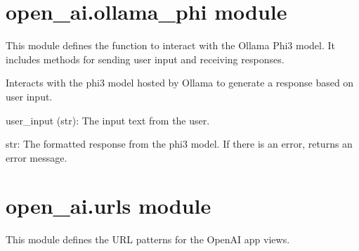\documentclass[letterpaper,10pt,english]{sphinxmanual}
\begin{document}
\section{open\_ai.ollama\_phi module}
\label{\detokenize{open_ai:open-ai-ollama-phi-module}}
\sphinxAtStartPar
This module defines the function to interact with the Ollama Phi3 model. It includes methods for sending user input and receiving responses.
\label{\detokenize{open_ai:module-open_ai.ollama_phi}}

\begin{fulllineitems}
\label{\detokenize{open_ai:open_ai.ollama_phi.get_phi3_response}}
\pysigstartsignatures
{}
\pysigstopsignatures
\sphinxAtStartPar
Interacts with the phi3 model hosted by Ollama to generate a response based on user input.
\begin{description}
\sphinxAtStartPar
user\_input (str): The input text from the user.

\sphinxAtStartPar
str: The formatted response from the phi3 model. If there is an error, returns an error message.

\end{description}

\end{fulllineitems}



\section{open\_ai.urls module}
\label{\detokenize{open_ai:open-ai-urls-module}}
\sphinxAtStartPar
This module defines the URL patterns for the OpenAI app views.
\end{document}
